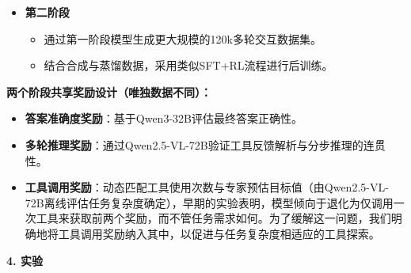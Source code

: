 \documentclass[zihao=false,fontset=windows]{ctexart}
\begin{document}
\begin{itemize}[label=\textcolor{feishuBlue}{2.}]
\item \textbf{第二阶段}
\begin{itemize}[label=\textcolor{feishuBlue}{\textbullet}]
\item 通过第一阶段模型生成更大规模的120k多轮交互数据集。

\end{itemize}

\begin{itemize}[label=\textcolor{feishuBlue}{\textbullet}]
\item 结合合成与蒸馏数据，采用类似SFT+RL流程进行后训练。

\end{itemize}

\end{itemize}

\textbf{两个阶段共享奖励设计（唯独数据不同）：}\par

\begin{itemize}[label=\textcolor{feishuBlue}{\textbullet}]
\item \textbf{答案准确度奖励}：基于Qwen3-32B评估最终答案正确性。

\end{itemize}

\begin{itemize}[label=\textcolor{feishuBlue}{\textbullet}]
\item \textbf{多轮推理奖励}：通过Qwen2.5-VL-72B验证工具反馈解析与分步推理的连贯性。

\end{itemize}

\begin{itemize}[label=\textcolor{feishuBlue}{\textbullet}]
\item \textbf{工具调用奖励}：动态匹配工具使用次数与专家预估目标值（由Qwen2.5-VL-72B离线评估任务复杂度确定），早期的实验表明，\textcolor{feishuRed}{模型倾向于退化为仅调用一次工具来获取前两个奖励}，而不管任务需求如何。为了缓解这一问题，我们明确地将工具调用奖励纳入其中，以促进与任务复杂度相适应的工具探索。

\end{itemize}


\Needspace{4cm}\par\vspace{0.9em}\begin{tcolorbox}[enhanced,colback=headRed,boxrule=0pt,arc=4pt,boxsep=0pt,left=3pt,right=3pt,top=2pt,bottom=2pt,before skip=0pt,after skip=3pt]\bfseries \textcolor{feishuBlue}{4.} 实验\end{tcolorbox}
\end{document}
